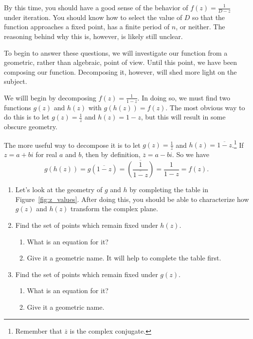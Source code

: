 \documentclass[../gatm.tex]{subfiles}
\begin{document}
By this time, you should have a good sense of the behavior of $f(z)=\frac{1}{D-z}$ under iteration. You should know how to select the value of $D$ so that the function approaches a fixed point, has a finite period of $n$, or neither. The reasoning behind why this is, however, is likely still unclear.

To begin to answer these questions, we will investigate our function from a geometric, rather than algebraic, point of view. Until this point, we have been composing our function. Decomposing it, however, will shed more light on the subject.

We willl begin by decomposing $f(z)=\frac{1}{1-z}$. In doing so, we must find two functions $g(z)$ and $h(z)$ with $g(h(z))=f(z)$. The most obvious way to do this is to let $g(z)=\frac{1}{z}$ and $h(z)=1-z$, but this will result in some obscure geometry.

The more useful way to decompose it is to let $g(z)=\frac{1}{\overline{z}}$ and $h(z)=\overline{1-z}$.\footnote{Remember that $\overline{z}$ is the complex conjugate.} If $z=a+bi$ for real $a$ and $b$, then by definition, $\overline{z}=a-bi$. So we have
$$g(h(z))=g(\overline{1-z})=\overline{\left(\frac{1}{\overline{1-z}}\right)}=\frac{1}{1-z}=f(z).$$

\begin{enumerate}
\item Let's look at the geometry of $g$ and $h$ by completing the table in Figure~\ref{fig:z_values}. After doing this, you should be able to characterize how $g(z)$ and $h(z)$ transform the complex plane.
\item Find the set of points which remain fixed under $h(z)$.
\begin{enumerate}
\item What is an equation for it?
\item Give it a geometric name. It will help to complete the table first.
\end{enumerate}
\item Find the set of points which remain fixed under $g(z)$. 
\begin{enumerate}
\item What is an equation for it?
\item Give it a geometric name.
\end{enumerate}
\end{enumerate}
\end{document}
